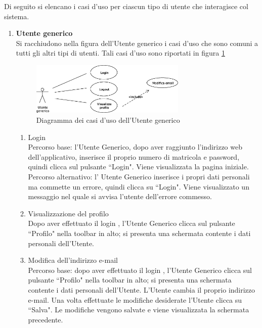 Di seguito si elencano i casi d'uso per ciascun tipo di utente che interagisce col sistema. 
\begin{enumerate}

\item \textbf{Utente generico}\\
Si racchiudono nella figura dell'Utente generico i casi d'uso che sono comuni a tutti gli altri tipi di utenti. Tali casi d'uso sono riportati in figura \ref{use_case_diag_generic}

\begin{figure}[h]
  \caption{Diagramma dei casi d'uso dell'Utente generico}
  \label{use_case_diag_generic}
  \centering
    \includegraphics[width=0.7\textwidth]{images/casi_uso_utente_generico.eps}
\end{figure}

\begin{enumerate}

 \item Login\\ \label{UC_login}
    Percorso base:
    l'Utente Generico, dopo aver raggiunto l'indirizzo web dell'applicativo, inserisce il proprio numero di matricola e password, quindi clicca sul pulsante ``Login". Viene visualizzata la pagina iniziale.\\
    Percorso alternativo:
    l' Utente Generico inserisce i propri dati personali ma commette un errore, quindi clicca su ``Login". Viene visualizzato un messaggio nel quale si avvisa l'utente dell'errore commesso.
    
 \item Visualizzazione del profilo\\ \label{UC_view_profile}
    Dopo aver effettuato il login , l'Utente Generico clicca sul pulsante ``Profilo" nella toolbar in alto; si presenta una schermata contente i dati personali dell'Utente.
 \item Modifica dell'indirizzo e-mail\\ \label{UC_edit_email}
  Percorso base:
  dopo aver effettuato il login , l'Utente Generico clicca sul pulsante ``Profilo" nella toolbar in alto; si presenta una schermata contente i dati personali dell'Utente.
  L'Utente cambia il proprio indirizzo e-mail. Una volta effettuate le modifiche desiderate l'Utente clicca su ``Salva". Le modifiche vengono salvate e viene visualizzata la schermata precedente.\\
  

\end{enumerate}
\end{enumerate}

